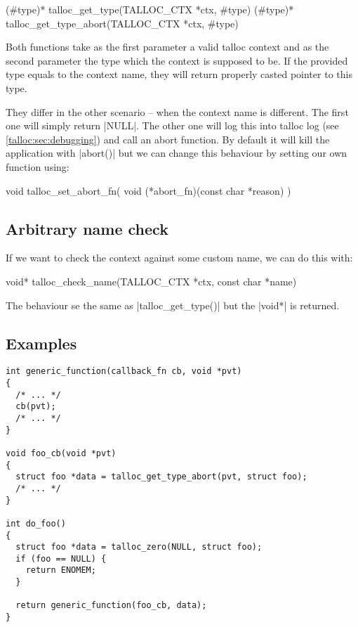 \begin{funcproto}
(#type)* talloc_get_type(TALLOC_CTX *ctx, #type)
(#type)* talloc_get_type_abort(TALLOC_CTX *ctx, #type)
\end{funcproto}
\funclistend
Both functions take as the first parameter a valid talloc context and as the
second parameter the type which the context is supposed to be. If the provided
type equals to the context name, they will return properly casted pointer to
this type.

They differ in the other scenario -- when the context name is different. The
first one will simply return |NULL|. The other one will log this into talloc log
(see \ref{talloc:sec:debugging}) and call an abort function. By default it will
kill the application with |abort()| but we can change this behaviour by setting
our own function using:

\begin{funcproto}
void talloc_set_abort_fn(
  void (*abort_fn)(const char *reason)
)
\end{funcproto}

\subsection{Arbitrary name check}

If we want to check the context against some custom name, we can do this with:

\begin{funcproto}
void* talloc_check_name(TALLOC_CTX *ctx, const char *name)
\end{funcproto}
\funclistend
The behaviour se the same as |talloc_get_type()| but the |void*| is returned.

\subsection{Examples}

\begin{lstlisting}[caption={Dynamic type system \#1}]
int generic_function(callback_fn cb, void *pvt)
{
  /* ... */
  cb(pvt);
  /* ... */
}

void foo_cb(void *pvt)
{
  struct foo *data = talloc_get_type_abort(pvt, struct foo);
  /* ... */
}

int do_foo()
{
  struct foo *data = talloc_zero(NULL, struct foo);
  if (foo == NULL) {
    return ENOMEM;
  }

  return generic_function(foo_cb, data);
}
\end{lstlisting}


